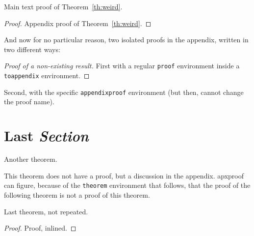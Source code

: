 \begin{inlineproof}
  Main text proof of Theorem~\ref{th:weird}.
\end{inlineproof}

\begin{proof}
  Appendix proof of Theorem~\ref{th:weird}.
\end{proof}

\begin{toappendix}
And now for no particular reason, two isolated proofs in the appendix,
  written in two different ways:

  \begin{proof}[Proof of a non-existing result]
    First with a regular \texttt{proof} environment inside a
    \texttt{toappendix} environment.
  \end{proof}
\end{toappendix}

\begin{appendixproof}
  Second, with the specific \texttt{appendixproof} environment (but then,
  cannot change the proof name).
\end{appendixproof}

\section{Last \textit{Section}}

\begin{theoremrep}
  Another theorem.
\end{theoremrep}

\begin{toappendix}
  This theorem does not have a proof, but a discussion in the appendix.
  \textsf{apxproof} can figure, because of the \verb|theorem| environment
  that follows, that the proof of the following theorem is not a proof of
  this theorem.
\end{toappendix}

\begin{theorem}
  Last theorem, not repeated.
\end{theorem}

\begin{proof}
  Proof, inlined.
\end{proof}





